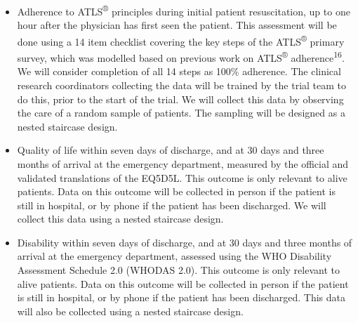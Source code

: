 \documentclass[
]{scrartcl}
\providecommand{\tightlist}{%
  \setlength{\itemsep}{0pt}\setlength{\parskip}{0pt}}\usepackage{longtable,booktabs,array}
\begin{document}
\begin{itemize}
\tightlist
\item
  Adherence to ATLS\textsuperscript{®} principles during initial patient
  resuscitation, up to one hour after the physician has first seen the
  patient. This assessment will be done using a 14 item checklist
  covering the key steps of the ATLS\textsuperscript{®} primary survey,
  which was modelled based on previous work on ATLS\textsuperscript{®}
  adherence\textsuperscript{16}. We will consider completion of all 14
  steps as 100\% adherence. The clinical research coordinators
  collecting the data will be trained by the trial team to do this,
  prior to the start of the trial. We will collect this data by
  observing the care of a random sample of patients. The sampling will
  be designed as a nested staircase design.
\item
  Quality of life within seven days of discharge, and at 30 days and
  three months of arrival at the emergency department, measured by the
  official and validated translations of the EQ5D5L. This outcome is
  only relevant to alive patients. Data on this outcome will be
  collected in person if the patient is still in hospital, or by phone
  if the patient has been discharged. We will collect this data using a
  nested staircase design.
\item
  Disability within seven days of discharge, and at 30 days and three
  months of arrival at the emergency department, assessed using the WHO
  Disability Assessment Schedule 2.0 (WHODAS 2.0). This outcome is only
  relevant to alive patients. Data on this outcome will be collected in
  person if the patient is still in hospital, or by phone if the patient
  has been discharged. This data will also be collected using a nested
  staircase design.
\end{itemize}
\end{document}
